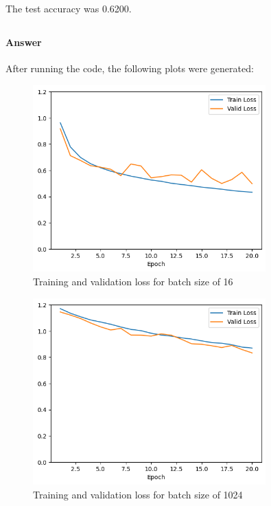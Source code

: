 \documentclass{article}
\begin{document}
The test accuracy was 0.6200.

\subsection{}

\subsubsection{}
\paragraph{Answer} After running the code, the following plots were generated:
\begin{figure}[H]
    \centering
    \includegraphics[width=0.8\textwidth]{"plots/mlp-training-loss-batch-16-lr-0.1-epochs-20-hidden-200-dropout-0.0-l2-0-layers-2-act-relu-opt-sgd.png"}
    \caption{Training and validation loss for batch size of 16}
    \label{2.2a batch size 16}
\end{figure}

\begin{figure}[H]
    \centering
    \includegraphics[width=0.8\textwidth]{"plots/mlp-training-loss-batch-1024-lr-0.1-epochs-20-hidden-200-dropout-0.0-l2-0-layers-2-act-relu-opt-sgd.png"}
    \caption{Training and validation loss for batch size of 1024}
    \label{2.2a batch size 1024}
\end{figure} 
\end{document}
